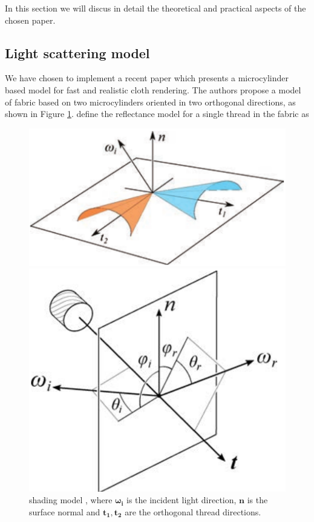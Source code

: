 \documentclass[12pt]{article}
\newcommand{\omegai}{\boldsymbol{\omega_i}}
\begin{document}
In this section we will discus in detail the theoretical and practical aspects of the chosen paper.

\subsection{Light scattering model}
\label{sec:light_scattering_model}
We have chosen to implement a recent paper \cite{Sadeghi2013} which presents a microcylinder based model for fast and realistic cloth rendering.
The authors propose a model of fabric based on two microcylinders oriented in two orthogonal directions, as shown in Figure \ref{fig:microcylinders}.
\citeauthor{Sadeghi2013} define the reflectance model for a single thread in the fabric as

\begin{figure}[ht!]
\begin{minipage}[b]{.45\textwidth}
\centering
\includegraphics[width=1\textwidth]{images/microcylinders}
	\caption{\citeauthor{Sadeghi2013} shading model \cite{Sadeghi2013}, where $\omegai$ is the incident light direction, $\mathbf{n}$ is the surface normal and $\mathbf{t_1},\mathbf{t_2}$ are the orthogonal thread directions.}
	\label{fig:microcylinders}
\end{minipage}
\hfill
\begin{minipage}[b]{.45\textwidth}
\centering
\includegraphics[width=1\textwidth]{images/cloth_directions}

\end{minipage}
\end{figure}
\end{document}
